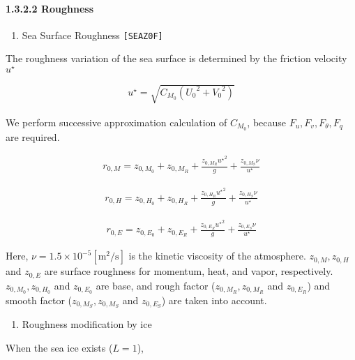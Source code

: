 \hypertarget{roughness}{%
\paragraph{1.3.2.2 Roughness}\label{roughness}}

\begin{enumerate}
\def\labelenumi{\arabic{enumi}.}
\tightlist
\item
  Sea Surface Roughness \texttt{{[}SEAZ0F{]}}
\end{enumerate}

The roughness variation of the sea surface is determined by the friction
velocity \(u^\star\)

\begin{eqnarray}
u^{\star} = \sqrt{C_{M_0} ({U_0}^2  +{V_0}^2)}
\end{eqnarray}

We perform successive approximation calculation of \({C_{M_0}}\),
because \(F_u,F_v,F_\theta,F_q\) are required.

\begin{eqnarray}
    r_{0,M} = z_{0,M_0} + z_{0,M_R} + \frac{z_{0,M_R} {u^\star }^2 }{g} + \frac{z_{0,M_S}\nu }{u^\star}
\end{eqnarray}

\begin{eqnarray}
    r_{0,H} = z_{0,H_0} + z_{0,H_R} + \frac{z_{0,H_R} {u^\star }^2 }{g} + \frac{z_{0,H_S}\nu }{u^\star}
\end{eqnarray}

\begin{eqnarray}
    r_{0,E} = z_{0,E_0} + z_{0,E_R} + \frac{z_{0,E_R} {u^\star }^2 }{g} + \frac{z_{0,E_S}\nu }{u^\star}
\end{eqnarray}

Here, \(\nu = 1.5 \times 10^{-5} \mathrm{[m^2/s]}\) is the kinetic
viscosity of the atmosphere. \(z_{0,M},z_{0,H}\) and \(z_{0,E}\) are
surface roughness for momentum, heat, and vapor, respectively.
\(z_{0,M_0},z_{0,H_0}\) and \(z_{0,E_0}\) are base, and rough factor
(\(z_{0,M_R},z_{0,M_R}\) and \(z_{0,E_R}\)) and smooth factor
(\(z_{0,M_S},z_{0,M_S}\) and \(z_{0,E_S}\)) are taken into account.

\begin{enumerate}
\def\labelenumi{\arabic{enumi}.}
\setcounter{enumi}{1}
\tightlist
\item
  Roughness modification by ice
\end{enumerate}

When the sea ice exists (\(L=1\)),

